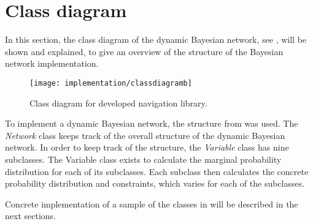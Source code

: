 \section{Class diagram}
In this section, the class diagram of the dynamic Bayesian network, see , will be shown and explained, to give an overview of the structure of the Bayesian network implementation.

\begin{figure}[H]
     \centering
     \texttt{[image: implementation/classdiagramb]}
     \caption{Class diagram for developed navigation library.}     
     \label{figure:class-diagram}
\end{figure}

To implement a dynamic Bayesian network, the structure from  was used.
The \textit{Network} class keeps track of the overall structure of the dynamic Bayesian network.
In order to keep track of the structure, the \textit{Variable} class has nine subclasses.
The Variable class exists to calculate the marginal probability distribution for each of its subclasses.
Each subclass then calculates the concrete probability distribution and constraints, which varies for each of the subclasses.

Concrete implementation of a sample of the classes in  will be described in the next sections.
